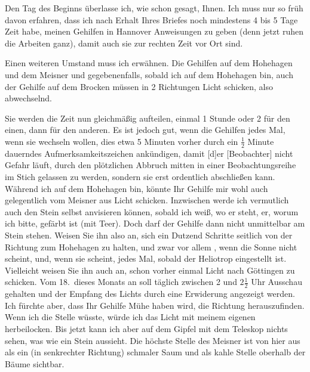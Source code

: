 \par\noindent\hspace*{\parindent}Den Tag des Beginns überlasse ich, wie schon gesagt, Ihnen.
Ich muss nur so früh davon erfahren, dass ich nach Erhalt Ihres Briefes noch mindestens 4 bis 5 Tage Zeit habe, meinen Gehilfen in Hannover Anweisungen zu geben (denn jetzt ruhen die Arbeiten ganz), damit auch sie zur rechten Zeit vor Ort sind.
\par\noindent\hspace*{\parindent}Einen weiteren Umstand muss ich erwähnen.
Die Gehilfen auf dem Hohehagen und dem Meisner und gegebenenfalls, sobald ich auf dem Hohehagen bin, auch der Gehilfe auf dem Brocken müssen in 2 Richtungen Licht schicken, also abwechselnd.
\par\noindent\hspace*{\parindent}Sie werden die Zeit nun gleichmäßig aufteilen, einmal 1 Stunde oder 2 für den einen, dann für den anderen.
Es ist jedoch gut, wenn die Gehilfen jedes Mal, wenn sie wechseln wollen, dies etwa 5 Minuten vorher durch ein \(\frac{1}{2}\) Minute dauerndes Aufmerksamkeitszeichen ankündigen, damit [d]er [Beobachter] nicht Gefahr läuft, durch den plötzlichen Abbruch mitten in einer Beobachtungsreihe im Stich gelassen zu werden, sondern sie erst ordentlich abschließen kann.
Während ich auf dem Hohehagen bin, könnte Ihr Gehilfe mir wohl auch gelegentlich vom Meisner aus Licht schicken.
Inzwischen werde ich vermutlich auch den Stein selbst anvisieren können, sobald ich weiß, wo er steht,  er, worum ich bitte,  gefärbt ist (mit Teer).
Doch darf der Gehilfe dann nicht unmittelbar am Stein stehen.
Weisen Sie ihn also an, sich ein Dutzend Schritte seitlich von der Richtung zum Hohehagen zu halten, und zwar vor allem , wenn die Sonne nicht scheint, und, wenn sie scheint, jedes Mal, sobald der Heliotrop eingestellt ist.
Vielleicht weisen Sie ihn auch an, schon vorher einmal Licht nach Göttingen zu schicken.
Vom 18.~dieses Monats an soll täglich zwischen 2 und \(2\frac{1}{2}\) Uhr Ausschau gehalten und der Empfang des Lichts durch eine Erwiderung angezeigt werden.
Ich fürchte aber, dass Ihr Gehilfe Mühe haben wird, die Richtung herauszufinden.
Wenn ich die Stelle wüsste, würde ich das Licht mit meinem eigenen herbeilocken.
Bis jetzt kann ich aber auf dem Gipfel mit dem Teleskop nichts sehen, was wie ein Stein aussieht.
Die höchste Stelle des Meisner ist von hier aus als ein (in senkrechter Richtung) schmaler Saum und als kahle Stelle oberhalb der Bäume sichtbar.
